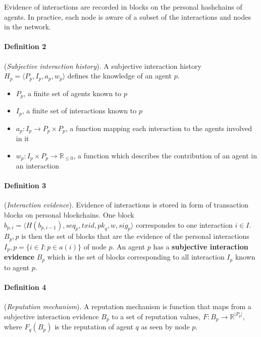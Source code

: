 Evidence of interactions are recorded in blocks on the personal hashchains of agents. In practice, each node is aware of a subset of the interactions and nodes in the network.

\paragraph{Definition 2} (\textit{Subjective interaction history}). A subjective interaction history $H_p = \langle P_p, I_p, a_p, w_p \rangle$ defines the knowledge of an agent $p$.
\begin{itemize}
    \item $P_p$, a finite set of agents known to $p$
    \item $I_p$, a finite set of interactions known to $p$
    \item $a_p : I_p \rightarrow P_p \times P_p$, a function mapping each interaction to the agents involved in it
    \item $w_p : I_p \times P_p \rightarrow \mathbb{R}_{\leq0}$, a function which describes the contribution of an agent in an interaction
\end{itemize}

\paragraph{Definition 3} (\textit{Interaction evidence}). Evidence of interactions is stored in form of transaction blocks on personal blockchains. One block $b_{p,i} = \langle H(b_{p,i-1}),{seq}_p, {txid}, {pk}_q, w, {sig}_p \rangle$ correspondes to one interaction $i \in I$. $B_p,p$ is then the set of blocks that are the evidence of the personal interactions $I_p,p = \{ i \in I : p \in a(i) \}$ of node $p$. An agent $p$ has a \textbf{subjective interaction evidence} $B_p$ which is the set of blocks corresponding to all interaction $I_p$ known to agent $p$.

\paragraph{Definition 4} (\textit{Reputation mechanism}). A reputation mechanism is function that maps from a subjective interaction evidence $B_p$ to a set of reputation values, $F: B_p \rightarrow \mathbb{R}^{\lvert P_p \rvert}$, where $F_q(B_p)$ is the reputation of agent $q$ as seen by node $p$.

